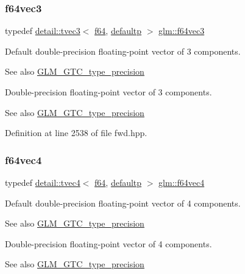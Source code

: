 \subsubsection{\texorpdfstring{f64vec3}{f64vec3}}
{\footnotesize\ttfamily typedef \hyperlink{structglm_1_1detail_1_1tvec3}{detail\+::tvec3}$<$ \hyperlink{group__gtc__type__precision_ga2bba392e555124b36cde6abba349bab3}{f64}, \hyperlink{namespaceglm_a0f04f086094c747d227af4425893f545a9d21ccd8b5a009ec7eb7677befc3bf51}{defaultp} $>$ \hyperlink{group__gtc__type__precision_ga794ee8f0a105cda01946cd9860f492a8}{glm\+::f64vec3}}

Default double-\/precision floating-\/point vector of 3 components. \begin{DoxySeeAlso}{See also}
\hyperlink{group__gtc__type__precision}{G\+L\+M\+\_\+\+G\+T\+C\+\_\+type\+\_\+precision}
\end{DoxySeeAlso}
Double-\/precision floating-\/point vector of 3 components. \begin{DoxySeeAlso}{See also}
\hyperlink{group__gtc__type__precision}{G\+L\+M\+\_\+\+G\+T\+C\+\_\+type\+\_\+precision} 
\end{DoxySeeAlso}


Definition at line 2538 of file fwd.\+hpp.

\mbox{\label{group__gtc__type__precision_gac10d088c5f1d16a62fb019408af34e1b}} 
\subsubsection{\texorpdfstring{f64vec4}{f64vec4}}
{\footnotesize\ttfamily typedef \hyperlink{structglm_1_1detail_1_1tvec4}{detail\+::tvec4}$<$ \hyperlink{group__gtc__type__precision_ga2bba392e555124b36cde6abba349bab3}{f64}, \hyperlink{namespaceglm_a0f04f086094c747d227af4425893f545a9d21ccd8b5a009ec7eb7677befc3bf51}{defaultp} $>$ \hyperlink{group__gtc__type__precision_gac10d088c5f1d16a62fb019408af34e1b}{glm\+::f64vec4}}

Default double-\/precision floating-\/point vector of 4 components. \begin{DoxySeeAlso}{See also}
\hyperlink{group__gtc__type__precision}{G\+L\+M\+\_\+\+G\+T\+C\+\_\+type\+\_\+precision}
\end{DoxySeeAlso}
Double-\/precision floating-\/point vector of 4 components. \begin{DoxySeeAlso}{See also}
\hyperlink{group__gtc__type__precision}{G\+L\+M\+\_\+\+G\+T\+C\+\_\+type\+\_\+precision} 
\end{DoxySeeAlso}


